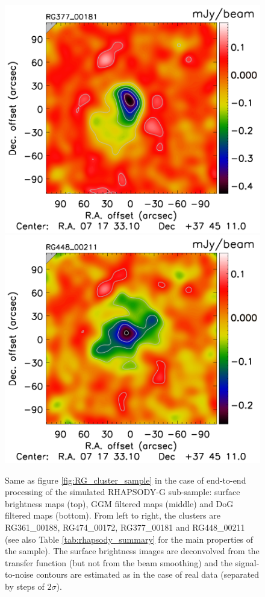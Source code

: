 \documentclass[twocolumn,traditabstract]{aa}
\begin{document}
\begin{figure}[h]
\includegraphics[trim=0cm 0.7cm 0cm 0cm, clip=true, totalheight=3.7cm]{Figure/DoG_RG377_00181_Ymap_zobs0p5_processed_15_15_45.pdf}
\includegraphics[trim=0cm 0.7cm 0cm 0cm, clip=true, totalheight=3.7cm]{Figure/DoG_RG448_00211_Ymap_zobs0p4_processed_15_15_45.pdf}
\caption{\footnotesize{Same as figure \ref{fig:RG_cluster_sample} in the case of end-to-end processing of the simulated RHAPSODY-G sub-sample: surface brightness maps (top), GGM filtered maps (middle) and DoG filtered maps (bottom). From left to right, the clusters are RG361\_00188, RG474\_00172, RG377\_00181 and RG448\_00211 (see also Table \ref{tab:rhapsody_summary} for the main properties of the sample). The surface brightness images are deconvolved from the transfer function (but not from the beam smoothing) and the signal-to-noise contours are estimated as in the case of real data (separated by steps of $2 \sigma$).}}
\label{fig:RG_cluster_sample_proc}
\end{figure}
\end{document}
